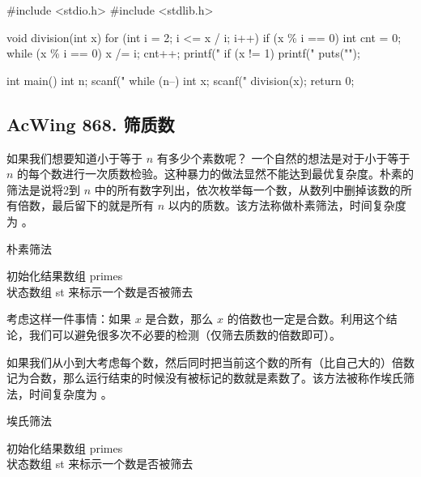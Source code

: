 \begin{mycpptwocol}[试除法分解质因数]
    #include <stdio.h>
    #include <stdlib.h>

    void division(int x) {
        for (int i = 2; i <= x / i; i++) {
            if (x \% i == 0) {
                int cnt = 0;
                while (x \% i == 0) {
                    x /= i;
                    cnt++;
                }
                printf("%
            }
        }
        if (x != 1) {
            printf("%
        }
        puts("");
    }

    int main() {
        int n;
        scanf("%
        while (n--) {
            int x;
            scanf("%
            division(x);
        }
        return 0;
    }
\end{mycpptwocol}

\subsection{AcWing 868. 筛质数}
如果我们想要知道小于等于 $n$ 有多少个素数呢？ 一个自然的想法是对于小于等于 $n$ 的每个数进行一次质数检验。这种暴力的做法显然不能达到最优复杂度。朴素的筛法是说将2到 $n$ 中的所有数字列出，依次枚举每一个数，从数列中删掉该数的所有倍数，最后留下的就是所有 $n$ 以内的质数。该方法称做朴素筛法，时间复杂度为 。

\begin{algorithm}[H] %
    \caption{朴素筛法}
    \SetAlgoLined
    初始化结果数组 primes \\
    状态数组 st 来标示一个数是否被筛去 \\

\end{algorithm}

考虑这样一件事情：如果 $x$ 是合数，那么 $x$ 的倍数也一定是合数。利用这个结论，我们可以避免很多次不必要的检测（仅筛去质数的倍数即可）。

如果我们从小到大考虑每个数，然后同时把当前这个数的所有（比自己大的）倍数记为合数，那么运行结束的时候没有被标记的数就是素数了。该方法被称作埃氏筛法，时间复杂度为 。

\begin{algorithm}[H] %
    \caption{埃氏筛法}
    \SetAlgoLined
    初始化结果数组 primes \\
    状态数组 st 来标示一个数是否被筛去 \\

\end{algorithm}

